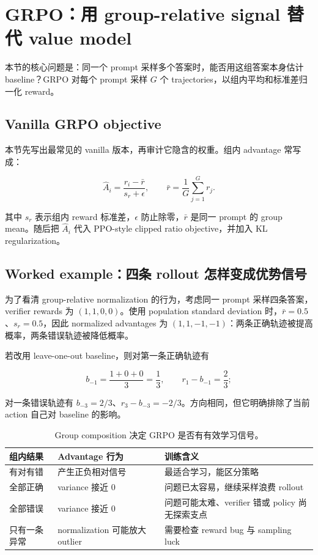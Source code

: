 \section{GRPO：用 group-relative signal 替代 value model}

本节的核心问题是：同一个 prompt 采样多个答案时，能否用这组答案本身估计 baseline？GRPO 对每个 prompt 采样 $G$ 个 trajectories，以组内平均和标准差归一化 reward。

\subsection{Vanilla GRPO objective}

本节先写出最常见的 vanilla 版本，再审计它隐含的权重。组内 advantage 常写成：

$$
\hat{A}_i=\frac{r_i-\bar r}{s_r+\epsilon},\qquad
\bar r=\frac{1}{G}\sum_{j=1}^{G}r_j.
$$

其中 $s_r$ 表示组内 reward 标准差，$\epsilon$ 防止除零，$\bar r$ 是同一 prompt 的 group mean。随后把 $\hat A_i$ 代入 PPO-style clipped ratio objective，并加入 KL regularization。

\subsection{Worked example：四条 rollout 怎样变成优势信号}

为了看清 group-relative normalization 的行为，考虑同一 prompt 采样四条答案，verifier rewards 为 $(1,1,0,0)$。使用 population standard deviation 时，$\bar r=0.5$、$s_r=0.5$，因此 normalized advantages 为 $(1,1,-1,-1)$：两条正确轨迹被提高概率，两条错误轨迹被降低概率。

若改用 leave-one-out baseline，则对第一条正确轨迹有

$$
b_{-1}=\frac{1+0+0}{3}=\frac{1}{3},
\qquad r_1-b_{-1}=\frac{2}{3};
$$

对一条错误轨迹有 $b_{-3}=2/3$、$r_3-b_{-3}=-2/3$。方向相同，但它明确排除了当前 action 自己对 baseline 的影响。

\begin{table}[H]
\centering
\begin{tabular}{L{0.22\textwidth}L{0.22\textwidth}L{0.46\textwidth}}
\toprule
组内结果 & Advantage 行为 & 训练含义 \\
\midrule
有对有错 & 产生正负相对信号 & 最适合学习，能区分策略 \\
全部正确 & variance 接近 0 & 问题已太容易，继续采样浪费 rollout \\
全部错误 & variance 接近 0 & 问题可能太难、verifier 错或 policy 尚无探索支点 \\
只有一条异常 & normalization 可能放大 outlier & 需要检查 reward bug 与 sampling luck \\
\bottomrule
\end{tabular}
\caption{Group composition 决定 GRPO 是否有有效学习信号。}
\end{table}

